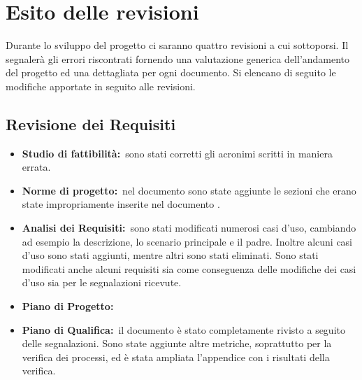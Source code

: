 \section{Esito delle revisioni}
	Durante lo sviluppo del progetto ci saranno quattro revisioni a cui sottoporsi. Il  segnalerà gli errori riscontrati fornendo una valutazione generica dell'andamento del progetto ed una dettagliata per ogni documento. Si elencano di seguito le modifiche apportate in seguito alle revisioni.
	\subsection{Revisione dei Requisiti}
		\begin{itemize}
			\item \textbf{Studio di fattibilità:}\ sono stati corretti gli acronimi scritti in maniera errata.
			\item \textbf{Norme di progetto:}\ nel documento sono state aggiunte le sezioni che erano state impropriamente inserite nel documento \PQdocRR.
			\item \textbf{Analisi dei Requisiti:}\ sono stati modificati numerosi casi d'uso, cambiando ad esempio la descrizione, lo scenario principale e il padre. Inoltre alcuni casi d'uso sono stati aggiunti, mentre altri sono stati eliminati. Sono stati modificati anche alcuni requisiti sia come conseguenza delle modifiche dei casi d'uso sia per le segnalazioni ricevute.
			\item \textbf{Piano di Progetto:}\ 
			\item \textbf{Piano di Qualifica:}\ il documento è stato completamente rivisto a seguito delle segnalazioni. Sono state aggiunte altre metriche, soprattutto per la verifica dei processi, ed è stata ampliata l'appendice con i risultati della verifica.
		\end{itemize}